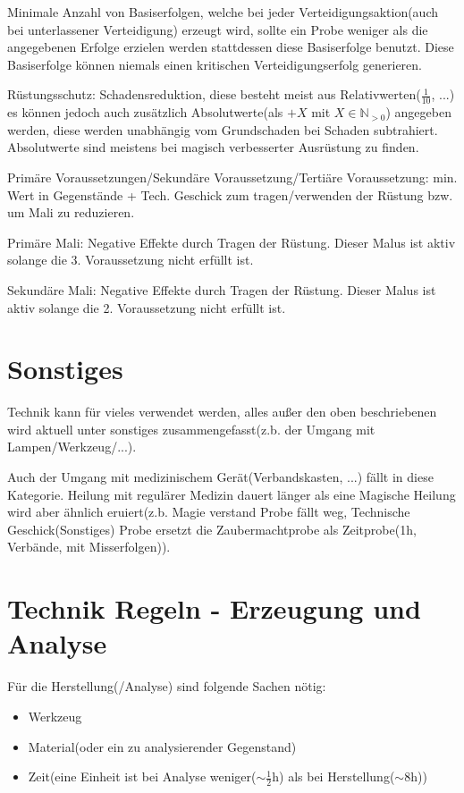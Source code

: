 Minimale Anzahl von Basiserfolgen, welche bei jeder Verteidigungsaktion(auch bei unterlassener Verteidigung) erzeugt wird, sollte ein Probe weniger als die angegebenen Erfolge erzielen werden stattdessen diese Basiserfolge benutzt. 
Diese Basiserfolge können niemals einen kritischen Verteidigungserfolg generieren.

Rüstungsschutz: Schadensreduktion, diese besteht meist aus Relativwerten($\frac{1}{10}$, ...) es können jedoch auch zusätzlich Absolutwerte(als $+X$ mit $X\in\mathbb N_{> 0}$) angegeben werden, diese werden unabhängig vom Grundschaden bei Schaden subtrahiert. Absolutwerte sind meistens bei magisch verbesserter Ausrüstung zu finden.

Primäre Voraussetzungen/Sekundäre Voraussetzung/Tertiäre Voraussetzung: min. Wert in Gegenstände + Tech. Geschick zum tragen/verwenden der Rüstung bzw. um Mali zu reduzieren.

Primäre Mali: Negative Effekte durch Tragen der Rüstung. Dieser Malus ist aktiv solange die 3. Voraussetzung nicht erfüllt ist.

Sekundäre Mali: Negative Effekte durch Tragen der Rüstung. Dieser Malus ist aktiv solange die 2. Voraussetzung nicht erfüllt ist.

\section{Sonstiges}

Technik kann für vieles verwendet werden, alles außer den oben beschriebenen wird aktuell unter sonstiges zusammengefasst(z.b. der Umgang mit Lampen/Werkzeug/...).

Auch der Umgang mit medizinischem Gerät(Verbandskasten, ...) fällt in diese Kategorie. Heilung mit regulärer Medizin dauert länger als eine Magische Heilung wird aber ähnlich eruiert(z.b. Magie verstand Probe fällt weg, Technische Geschick(Sonstiges) Probe ersetzt die Zaubermachtprobe als Zeitprobe(1h, Verbände, mit Misserfolgen)).

\section{Technik Regeln - Erzeugung und Analyse}
Für die Herstellung(/Analyse) sind folgende Sachen nötig:
\begin{itemize}
\item Werkzeug
\item Material(oder ein zu analysierender Gegenstand)
\item Zeit(eine Einheit ist bei Analyse weniger($\sim \frac{1}{2}$h) als bei Herstellung($\sim 8$h))
\end{itemize}

